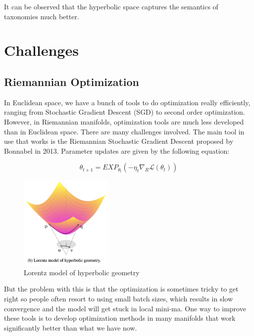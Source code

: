 It can be observed that the hyperbolic space captures the semantics of taxonomies much better.


\section{Challenges}

\subsection{Riemannian Optimization}

In Euclidean space, we have a bunch of tools to do optimization really efficiently, ranging from Stochastic Gradient Descent (SGD) to second order optimization. However, in Riemannian manifolds, optimization tools are much less developed than in Euclidean space. There are many challenges involved. The main tool in use that works is the Riemannian Stochastic Gradient Descent proposed by Bonnabel in 2013. Parameter updates are given by the following equation:

\begin{equation} \label{eq:RSGD}
    \theta_{t+1} = EXP_{\theta_t} (−\eta_t \nabla_R \mathcal{L}(\theta_t))
\end{equation}

\begin{figure}[htb]
  \centering
    \includegraphics[width=0.4\textwidth]{lectures/11-b/Images/1-Lorentz.png}
    \caption{Lorentz model of hyperbolic geometry}
    \label{fig:1-Lorentz}
\end{figure}

But the problem with this is that the optimization is sometimes tricky to get right so people often resort to using small batch sizes, which results in slow convergence and the model will get stuck in local mini-ma. One way to improve these tools is to develop optimization methods in many manifolds that work significantly better than what we have now.

